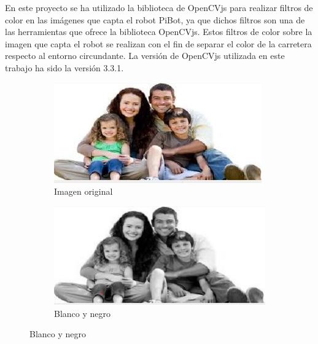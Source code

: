 \documentclass{report}
\begin{document}
En este proyecto se ha utilizado la biblioteca de OpenCVjs para realizar filtros de color en las imágenes que capta el robot PiBot, ya que dichos filtros son una de las herramientas que ofrece la biblioteca OpenCVjs. Estos filtros de color sobre la imagen que capta el robot se realizan con el fin de separar el color de la carretera respecto al entorno circundante. La versión de OpenCVjs utilizada en este trabajo ha sido la versión 3.3.1.

\begin{figure}[h]
\begin{subfigure}{.5\textwidth}
  \centering
  \includegraphics[width=.7\linewidth]{images/imagen.JPG}  
  \caption{Imagen original}
  \label{fig:sub-first}
\end{subfigure}
\begin{subfigure}{.5\textwidth}
  \centering
  \includegraphics[width=.7\linewidth]{images/gris.JPG}  
  \caption{Blanco y negro}
  \label{fig:sub-second}
\end{subfigure}



\end{figure}
\end{document}
